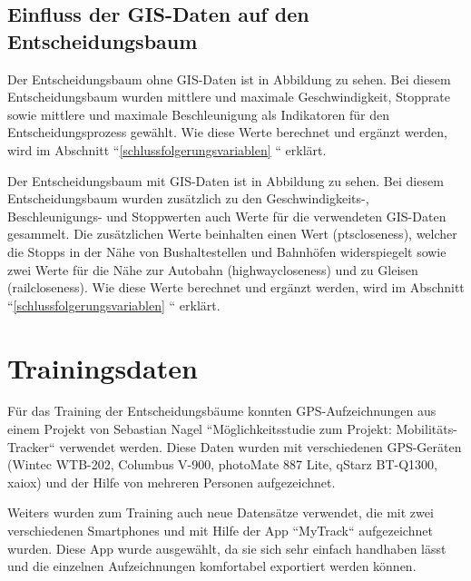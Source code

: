 
\subsection{Einfluss der GIS-Daten auf den Entscheidungsbaum}
\label{entscheidungsbaum}
Der Entscheidungsbaum ohne GIS-Daten ist in Abbildung  zu sehen. Bei diesem Entscheidungsbaum wurden mittlere und maximale Geschwindigkeit, Stopprate sowie mittlere und maximale Beschleunigung als Indikatoren für den Entscheidungsprozess gewählt. Wie diese Werte berechnet und ergänzt werden, wird im Abschnitt ``\ref {schlussfolgerungsvariablen}  `` erklärt. 

\clearpage

\label{entscheidungsbaumGIS}
Der Entscheidungsbaum mit GIS-Daten ist in Abbildung  zu sehen. Bei diesem Entscheidungsbaum wurden zusätzlich zu den Geschwindigkeits-, Beschleunigungs- und Stoppwerten auch Werte für die verwendeten GIS-Daten gesammelt. Die zusätzlichen Werte beinhalten einen Wert (ptscloseness), welcher die Stopps in der Nähe von Bushaltestellen und Bahnhöfen widerspiegelt sowie zwei Werte für die Nähe zur Autobahn (highwaycloseness) und zu Gleisen (railcloseness). Wie diese Werte berechnet und ergänzt werden, wird im Abschnitt ``\ref{schlussfolgerungsvariablen} `` erklärt.

\clearpage

\section{Trainingsdaten}
\label{sec:trainingdata}
Für das Training der Entscheidungsbäume konnten GPS-Aufzeichnungen aus einem Projekt von Sebastian Nagel ``Möglichkeitsstudie zum Projekt: Mobilitäts-Tracker`` verwendet werden. Diese Daten wurden mit verschiedenen GPS-Geräten (Wintec WTB-202, Columbus V-900, photoMate 887 Lite, qStarz BT-Q1300, xaiox) und der Hilfe von mehreren Personen aufgezeichnet. \cite{sebastian_nagel_moglichkeitsstudie_2011}

Weiters wurden zum Training auch neue Datensätze verwendet, die mit zwei verschiedenen Smartphones und mit Hilfe der App ``MyTrack`` aufgezeichnet wurden. Diese App wurde ausgewählt, da sie sich sehr einfach handhaben lässt und die einzelnen Aufzeichnungen komfortabel exportiert werden können. 

